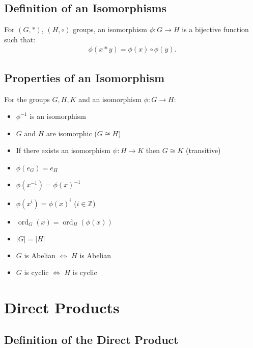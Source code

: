 \documentclass[a4paper, 12pt, twoside]{article}
\DeclareMathOperator{\Ord}{ord}
\begin{document}
\subsection{Definition of an Isomorphisms}

For $(G, *)$, $(H, \circ)$ groups, an isomorphism $\phi : G \to H$
is a bijective function such that:
\begin{align*}
      \phi(x * y) = \phi(x) \circ \phi(y). \tag{$\forall x, y \in G$}
\end{align*}

\newpage

\subsection{Properties of an Isomorphism}

For the groups $G, H, K$ and an isomorphism $\phi : G \to H$:

\begin{multicols}{2}
      \begin{itemize}
            \item $\phi^{-1}$ is an isomorphism
            \item $G$ and $H$ are isomorphic ($G \cong H$)
            \item If there exists an isomorphism $\psi:H \to K$
                  then $G \cong K$ (transitive)
            \item $\phi(e_G) = e_H$
            \item $\phi(x^{-1}) = \phi(x)^{-1}$
      \end{itemize}
      \columnbreak
      \begin{itemize}
            \item $\phi(x^i) = \phi(x)^i$ ($i \in \mathbb{Z}$)
            \item $\Ord_G(x) = \Ord_H(\phi(x))$
            \item $|G| = |H|$
            \item $G$ is Abelian $\Leftrightarrow$ $H$ is Abelian
            \item $G$ is cyclic $\Leftrightarrow$ $H$ is cyclic
      \end{itemize}
\end{multicols}

\section{Direct Products}

\subsection{Definition of the Direct Product}
\end{document}
